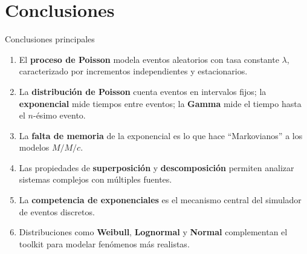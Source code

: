 \documentclass[aspectratio=1610, 9pt]{beamer}
\begin{document}
\section{Conclusiones}

\begin{frame}{Conclusiones principales}

\begin{enumerate}
    \item El \textbf{proceso de Poisson} modela eventos aleatorios con tasa constante $\lambda$, caracterizado por incrementos independientes y estacionarios.

    \vspace{0.15cm}
    \item La \textbf{distribuci\'{o}n de Poisson} cuenta eventos en intervalos fijos; la \textbf{exponencial} mide tiempos entre eventos; la \textbf{Gamma} mide el tiempo hasta el $n$-\'{e}simo evento.

    \vspace{0.15cm}
    \item La \textbf{falta de memoria} de la exponencial es lo que hace ``Markovianos'' a los modelos $M/M/c$.

    \vspace{0.15cm}
    \item Las propiedades de \textbf{superposici\'{o}n} y \textbf{descomposici\'{o}n} permiten analizar sistemas complejos con m\'{u}ltiples fuentes.

    \vspace{0.15cm}
    \item La \textbf{competencia de exponenciales} es el mecanismo central del simulador de eventos discretos.

    \vspace{0.15cm}
    \item Distribuciones como \textbf{Weibull}, \textbf{Lognormal} y \textbf{Normal} complementan el toolkit para modelar fen\'{o}menos m\'{a}s realistas.
\end{enumerate}
\end{frame}
\end{document}
